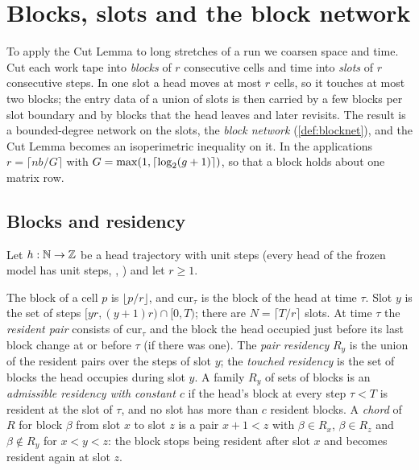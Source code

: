 \section{Blocks, slots and the block network}\label{sec:blocks}

To apply the Cut Lemma to long stretches of a run we coarsen space and time. Cut each work tape
into \emph{blocks} of $r$ consecutive cells and time into \emph{slots} of $r$ consecutive steps.
In one slot a head moves at most $r$ cells, so it touches at most two blocks; the entry data of a
union of slots is then carried by a few blocks per slot boundary and by blocks that the head
leaves and later revisits. The result is a bounded-degree network on the slots, the
\emph{block network} (\cref{def:blocknet}), and the Cut Lemma becomes an isoperimetric inequality on it. In the
applications $r=\lceil nb/G\rceil$ with $G=\max(1,\lceil \log_2 (g+1) \rceil)$, so that a block holds about one
matrix row.

\subsection{Blocks and residency}

Let $h:\mathbb{N}\to\mathbb{Z}$ be a head trajectory with unit steps (every head of the frozen model has unit
steps, , ) and let $r\ge1$.

\begin{definition}\label{def:residency}
The block of a cell $p$ is $\lfloor p/r\rfloor$, and $\mathrm{cur}_\tau$ is the block of the head
at time $\tau$. Slot $y$ is the set of steps $[yr,(y+1)r)\cap[0,T)$; there are
$N=\lceil T/r\rceil$ slots. At time $\tau$ the \emph{resident pair} consists of $\mathrm{cur}_\tau$
and the block the head occupied just before its last block change at or before $\tau$ (if there
was one). The \emph{pair residency} $R_y$ is the union of the resident pairs over the steps of
slot $y$; the \emph{touched residency} is the set of blocks the head occupies during slot $y$. A
family $R_y$ of sets of blocks is an \emph{admissible residency with constant $c$} if the head's
block at every step $\tau<T$ is resident at the slot of $\tau$, and no slot has more than $c$
resident blocks. A \emph{chord} of $R$ for block $\beta$ from slot $x$ to slot $z$ is a pair
$x+1<z$ with $\beta\in R_x$, $\beta\in R_z$ and $\beta\notin R_y$ for $x<y<z$: the block stops
being resident after slot $x$ and becomes resident again at slot $z$.
\end{definition}

